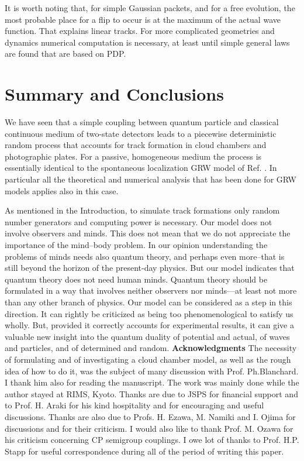 \documentclass[12pt]{article}
\begin{document}
It is worth noting that, for simple Gaussian packets, and for a free
evolution, the most probable place for a flip to occur is at the maximum of
the actual wave function. That explains linear tracks. For more
complicated geometries and dynamics numerical computation is necessary,
at least until simple general laws are found that are based on PDP.

\section{Summary and Conclusions}
We have seen that a simple coupling between quantum particle and classical
continuous medium of two-state detectors leads to a piecewise
deterministic random process that accounts for track formation in cloud
chambers and photographic plates. For a passive, homogeneous medium the
process is essentially identical to the spontaneous localization GRW model
of Ref. \cite{ghi1}. In particular all the theoretical and numerical
analysis that has been done for GRW models applies also in this case.

As
mentioned in the Introduction, to simulate track formations only random
number generators and computing power is necessary. Our model does not
involve observers and minds. This does not mean that we do not appreciate
the importance of the mind--body problem. In our opinion understanding the
problems of minds needs also quantum theory, and perhaps even more--that
is still beyond the horizon of the present-day physics. But our model
indicates that quantum theory does not need human minds. Quantum theory
should be formulated in a way that involves neither observers nor minds---at
least not more than any other branch of physics. Our model can be
considered as a step in this direction. It can rightly be criticized as
being too phenomenological to satisfy us wholly. But, provided it correctly
accounts for experimental results, it can give a valuable new insight into
the quantum duality of potential and actual, of waves and particles, and of
determined and random.
\newpage
\noindent
{\bf Acknowledgments}
The necessity of formulating and of investigating a cloud chamber model, as
well as the rough idea of how to do it, was the subject of many discussion
with Prof. Ph.Blanchard. I thank him also for reading the manuscript. The
work was mainly done while the author stayed at RIMS, Kyoto. Thanks are due
to JSPS for financial support and to Prof. H. Araki for his kind
hospitality and for encouraging and useful discussions. Thanks are also due
to Profs. H. Ezawa, M. Namiki and I. Ojima for discussions and for their
criticism. I would also like to thank Prof. M. Ozawa for his criticism
concerning CP semigroup couplings. I owe lot of thanks to Prof. H.P. Stapp
for useful correspondence during all of the period of writing this
paper.
\end{document}
